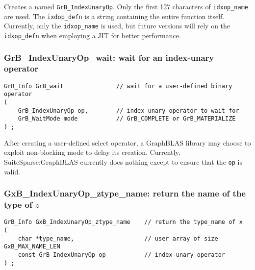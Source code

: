 \documentclass[12pt]{article}
\begin{document}
{Creates a named \verb'GrB_IndexUnaryOp'.  Only the first 127 characters of
\verb'idxop_name' are used.  The \verb'ixdop_defn' is a string containing the
entire function itself.  Currently, only the \verb'idxop_name' is used, but
future versions will rely on the \verb'idxop_defn' when employing a JIT for
better performance.

\subsubsection{{\sf GrB\_IndexUnaryOp\_wait:} wait for an index-unary operator}
\label{idxunop_wait}

\begin{mdframed}[userdefinedwidth=6in]
{\footnotesize
\begin{verbatim}
GrB_Info GrB_wait               // wait for a user-defined binary operator
(
    GrB_IndexUnaryOp op,        // index-unary operator to wait for   
    GrB_WaitMode mode           // GrB_COMPLETE or GrB_MATERIALIZE
) ;
\end{verbatim}
}\end{mdframed}

After creating a user-defined select operator, a GraphBLAS library may choose
to exploit non-blocking mode to delay its creation.  Currently,
SuiteSparse:GraphBLAS currently does nothing except to ensure that the
\verb'op' is valid.

\subsubsection{{\sf GxB\_IndexUnaryOp\_ztype\_name:} return the name of the type of $z$}
\label{idxunop_ztype_name}

\begin{mdframed}[userdefinedwidth=6in]
{\footnotesize
\begin{verbatim}
GrB_Info GxB_IndexUnaryOp_ztype_name    // return the type_name of x
(
    char *type_name,                    // user array of size GxB_MAX_NAME_LEN
    const GrB_IndexUnaryOp op           // index-unary operator
) ;
\end{verbatim}
}\end{mdframed}

}
\end{document}
